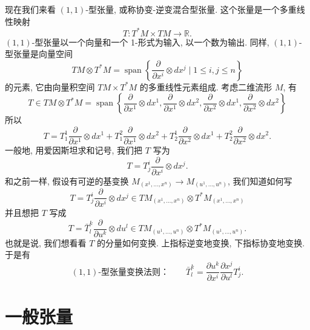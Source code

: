 现在我们来看 $(1,1)$-型张量, 或称协变-逆变混合型张量. 这个张量是一个多重线性映射
\[
T:T^*M\times TM\to\mathbb{R}.
\]
$(1,1)$-型张量以一个向量和一个 1-形式为输入, 以一个数为输出. 同样, $(1,1)$-型张量是向量空间
\[
TM\otimes T^*M=\operatorname{span}\left\{\frac{\partial}{\partial x^i}\otimes dx^j\mid 1\leq i,j\leq n\right\}
\]
的元素, 它由向量积空间 $TM\times T^*M$ 的多重线性元素组成. 考虑二维流形 $M$, 有
\[
T\in TM\otimes T^*M=\operatorname{span}\left\{\frac{\partial}{\partial x^1}\otimes dx^1,\frac{\partial}{\partial x^1}\otimes dx^2,\frac{\partial}{\partial x^2}\otimes dx^1,\frac{\partial}{\partial x^2}\otimes dx^2\right\}
\]
所以
\[
T=T^1_1\frac{\partial}{\partial x^1}\otimes dx^1+T^2_1\frac{\partial}{\partial x^1}\otimes dx^2+T^1_2\frac{\partial}{\partial x^2}\otimes dx^1+T^2_2\frac{\partial}{\partial x^2}\otimes dx^2.
\]
一般地, 用爱因斯坦求和记号, 我们把 $T$ 写为
\[
T=T^i_j\frac{\partial}{\partial x^i}\otimes dx^j.
\]
和之前一样, 假设有可逆的基变换 $M_{(x^1,\ldots,x^n)}\to M_{(u^1,\ldots,u^n)}$, 我们知道如何写
\[
T=T^i_j\frac{\partial}{\partial x^i}\otimes dx^j\in TM_{(x^1,\ldots,x^n)}\otimes T^*M_{(x^1,\ldots,x^n)}
\]
并且想把 $T$ 写成
\[
T=\bar{T}^k_l\frac{\partial}{\partial u^k}\otimes du^l\in TM_{(u^1,\ldots,u^n)}\otimes T^*M_{(u^1,\ldots,u^n)}.
\]
也就是说, 我们想看看 $T$ 的分量如何变换. 上指标逆变地变换, 下指标协变地变换. 于是有
\[
(1,1)\text{-型张量变换法则：}\qquad \bar{T}^k_l=\frac{\partial u^k}{\partial x^i}\frac{\partial x^j}{\partial u^l}T^i_j.
\]

\section{一般张量}

